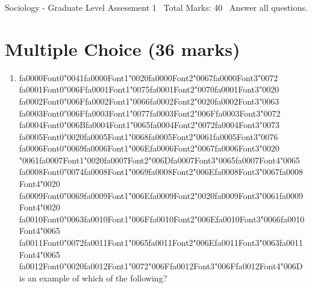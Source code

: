 \documentclass[12pt]{article}
\begin{document}
\begin{center}
Sociology - Graduate Level Assessment 1 \
Total Marks: 40 \
Answer all questions.
\end{center}

\section*{Multiple Choice (36 marks)}
\begin{enumerate}[label=\arabic*.]
\item {\csname fa0000Font0\endcsname\char"0041}{\csname fa0000Font1\endcsname\char"0020}{\csname fa0000Font2\endcsname\char"0067}{\csname fa0000Font3\endcsname\char"0072} {\csname fa0001Font0\endcsname\char"006F}{\csname fa0001Font1\endcsname\char"0075}{\csname fa0001Font2\endcsname\char"0070}{\csname fa0001Font3\endcsname\char"0020} {\csname fa0002Font0\endcsname\char"006F}{\csname fa0002Font1\endcsname\char"0066}{\csname fa0002Font2\endcsname\char"0020}{\csname fa0002Font3\endcsname\char"0063} {\csname fa0003Font0\endcsname\char"006F}{\csname fa0003Font1\endcsname\char"0077}{\csname fa0003Font2\endcsname\char"006F}{\csname fa0003Font3\endcsname\char"0072} {\csname fa0004Font0\endcsname\char"006B}{\csname fa0004Font1\endcsname\char"0065}{\csname fa0004Font2\endcsname\char"0072}{\csname fa0004Font3\endcsname\char"0073} {\csname fa0005Font0\endcsname\char"0020}{\csname fa0005Font1\endcsname\char"0068}{\csname fa0005Font2\endcsname\char"0061}{\csname fa0005Font3\endcsname\char"0076} {\csname fa0006Font0\endcsname\char"0069}{\csname fa0006Font1\endcsname\char"006E}{\csname fa0006Font2\endcsname\char"0067}{\csname fa0006Font3\endcsname\char"0020} {\char"0061}{\csname fa0007Font1\endcsname\char"0020}{\csname fa0007Font2\endcsname\char"006D}{\csname fa0007Font3\endcsname\char"0065}{\csname fa0007Font4\endcsname\char"0065} {\csname fa0008Font0\endcsname\char"0074}{\csname fa0008Font1\endcsname\char"0069}{\csname fa0008Font2\endcsname\char"006E}{\csname fa0008Font3\endcsname\char"0067}{\csname fa0008Font4\endcsname\char"0020} {\csname fa0009Font0\endcsname\char"0069}{\csname fa0009Font1\endcsname\char"006E}{\csname fa0009Font2\endcsname\char"0020}{\csname fa0009Font3\endcsname\char"0061}{\csname fa0009Font4\endcsname\char"0020} {\csname fa0010Font0\endcsname\char"0063}{\csname fa0010Font1\endcsname\char"006F}{\csname fa0010Font2\endcsname\char"006E}{\csname fa0010Font3\endcsname\char"0066}{\csname fa0010Font4\endcsname\char"0065} {\csname fa0011Font0\endcsname\char"0072}{\csname fa0011Font1\endcsname\char"0065}{\csname fa0011Font2\endcsname\char"006E}{\csname fa0011Font3\endcsname\char"0063}{\csname fa0011Font4\endcsname\char"0065} {\csname fa0012Font0\endcsname\char"0020}{\csname fa0012Font1\endcsname\char"0072}{\char"006F}{\csname fa0012Font3\endcsname\char"006F}{\csname fa0012Font4\endcsname\char"006D} is an example of which of the following?

\end{enumerate}
\end{document}
